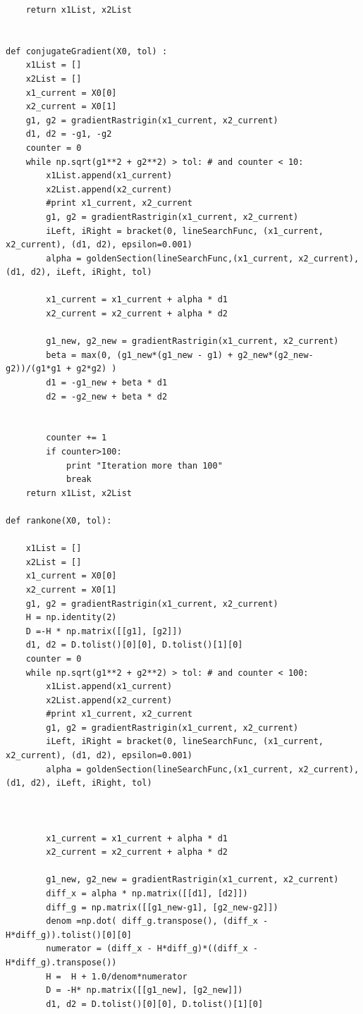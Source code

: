 \documentclass{article}
\begin{document}
\begin{lstlisting}
    return x1List, x2List


def conjugateGradient(X0, tol) :
    x1List = []
    x2List = []
    x1_current = X0[0]
    x2_current = X0[1]
    g1, g2 = gradientRastrigin(x1_current, x2_current)
    d1, d2 = -g1, -g2
    counter = 0
    while np.sqrt(g1**2 + g2**2) > tol: # and counter < 10:
        x1List.append(x1_current)
        x2List.append(x2_current)
        #print x1_current, x2_current
        g1, g2 = gradientRastrigin(x1_current, x2_current)
        iLeft, iRight = bracket(0, lineSearchFunc, (x1_current, x2_current), (d1, d2), epsilon=0.001)
        alpha = goldenSection(lineSearchFunc,(x1_current, x2_current),(d1, d2), iLeft, iRight, tol)

        x1_current = x1_current + alpha * d1
        x2_current = x2_current + alpha * d2

        g1_new, g2_new = gradientRastrigin(x1_current, x2_current)
        beta = max(0, (g1_new*(g1_new - g1) + g2_new*(g2_new-g2))/(g1*g1 + g2*g2) )
        d1 = -g1_new + beta * d1
        d2 = -g2_new + beta * d2

        
        counter += 1
        if counter>100:
            print "Iteration more than 100"
            break
    return x1List, x2List

def rankone(X0, tol):

    x1List = []
    x2List = []
    x1_current = X0[0]
    x2_current = X0[1]
    g1, g2 = gradientRastrigin(x1_current, x2_current)
    H = np.identity(2)
    D =-H * np.matrix([[g1], [g2]])
    d1, d2 = D.tolist()[0][0], D.tolist()[1][0]
    counter = 0 
    while np.sqrt(g1**2 + g2**2) > tol: # and counter < 100:
        x1List.append(x1_current)
        x2List.append(x2_current)
        #print x1_current, x2_current
        g1, g2 = gradientRastrigin(x1_current, x2_current)
        iLeft, iRight = bracket(0, lineSearchFunc, (x1_current, x2_current), (d1, d2), epsilon=0.001)
        alpha = goldenSection(lineSearchFunc,(x1_current, x2_current),(d1, d2), iLeft, iRight, tol)



        x1_current = x1_current + alpha * d1
        x2_current = x2_current + alpha * d2

        g1_new, g2_new = gradientRastrigin(x1_current, x2_current)
        diff_x = alpha * np.matrix([[d1], [d2]])
        diff_g = np.matrix([[g1_new-g1], [g2_new-g2]])
        denom =np.dot( diff_g.transpose(), (diff_x - H*diff_g)).tolist()[0][0]
        numerator = (diff_x - H*diff_g)*((diff_x - H*diff_g).transpose())
        H =  H + 1.0/denom*numerator
        D = -H* np.matrix([[g1_new], [g2_new]])
        d1, d2 = D.tolist()[0][0], D.tolist()[1][0]


\end{lstlisting}
\end{document}
